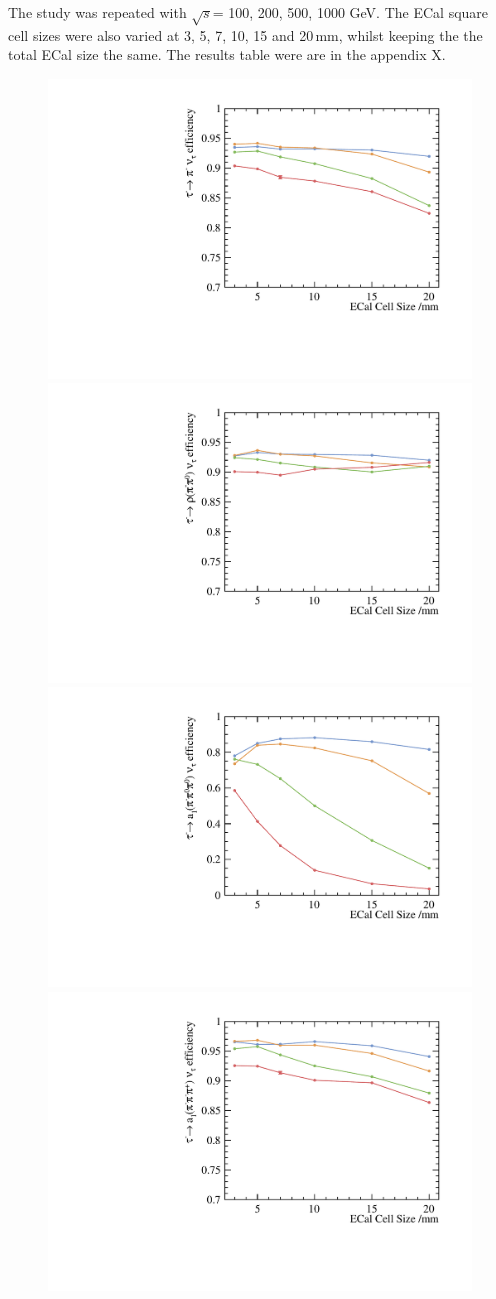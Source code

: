 \documentclass[a4paper,11pt]{article}
\newcommand{\rootS}{\ensuremath{\sqrt{s}}}
\begin{document}
The study was repeated with  \rootS = 100, 200, 500, 1000 GeV. The ECal square cell sizes were also varied at 3, 5, 7, 10, 15 and 20\,mm, whilst keeping the the total ECal size the same. The results table were are in the appendix X. 

\begin{figure}[htbp]
\centering %
\includegraphics[width=.45\textwidth]{plots/decayMode2}
\qquad
\includegraphics[width=.45\textwidth]{plots/decayMode3} 
\qquad
\includegraphics[width=.45\textwidth]{plots/decayMode4} 
\qquad
\includegraphics[width=.45\textwidth]{plots/decayMode5}
\qquad

\end{figure}
\end{document}
